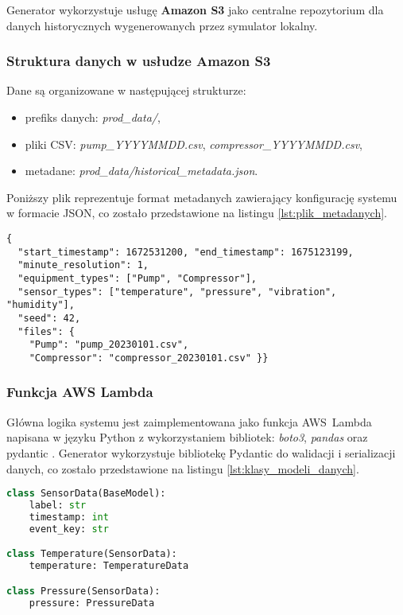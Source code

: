 Generator wykorzystuje usługę \textbf{Amazon S3} jako centralne repozytorium dla danych historycznych wygenerowanych przez symulator lokalny.

\subsubsection{Struktura danych w usłudze Amazon S3}

Dane są organizowane w następującej strukturze:

\begin{itemize}
    \item prefiks danych: \textit{prod\_data/},
    \item pliki CSV: \textit{pump\_YYYYMMDD.csv}, \textit{compressor\_YYYYMMDD.csv},
    \item metadane: \textit{prod\_data/historical\_metadata.json}.
\end{itemize}

\vspace{0.3em}

Poniższy plik reprezentuje format metadanych zawierający konfigurację systemu w formacie JSON, co zostało przedstawione na listingu \ref{lst:plik_metadanych}.

\begin{lstlisting}[caption=Przykładowy plik metadanych, label={lst:plik_metadanych}]
{
  "start_timestamp": 1672531200, "end_timestamp": 1675123199,
  "minute_resolution": 1,
  "equipment_types": ["Pump", "Compressor"],
  "sensor_types": ["temperature", "pressure", "vibration", "humidity"],
  "seed": 42,
  "files": {
    "Pump": "pump_20230101.csv",
    "Compressor": "compressor_20230101.csv" }}
\end{lstlisting}

\newpage

\subsubsection{Funkcja AWS Lambda}
\label{subsec:aws_lambda}

Główna logika systemu jest zaimplementowana jako funkcja \mbox{AWS Lambda} napisana w języku Python z wykorzystaniem bibliotek: \textit{boto3}, \textit{pandas} oraz pydantic \cite{pydantic_docs}. Generator wykorzystuje bibliotekę Pydantic do walidacji i serializacji danych, co zostało przedstawione na listingu \ref{lst:klasy_modeli_danych}.

\begin{lstlisting}[language=Python, caption=Klasy modeli danych, label={lst:klasy_modeli_danych}]
class SensorData(BaseModel):
    label: str
    timestamp: int
    event_key: str

class Temperature(SensorData):
    temperature: TemperatureData

class Pressure(SensorData):
    pressure: PressureData
\end{lstlisting}

